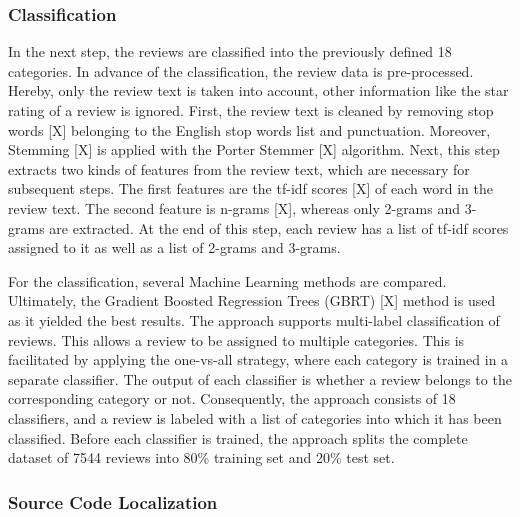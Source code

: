 \subsubsection{Classification}

In the next step, the reviews are classified into the previously defined 18 categories. In advance of the classification, the review data is pre-processed. Hereby, only the review text is taken into account, other information like the star rating of a review is ignored. First, the review text is cleaned by removing stop words [X] belonging to the English stop words list and punctuation. Moreover, Stemming [X] is applied with the Porter Stemmer [X] algorithm. Next, this step extracts two kinds of features from the review text, which are necessary for subsequent steps. The first features are the tf-idf scores [X] of each word in the review text. The second feature is n-grams [X], whereas only 2-grams and 3-grams are extracted. At the end of this step, each review has a list of tf-idf scores assigned to it as well as a list of 2-grams and 3-grams. 

For the classification, several Machine Learning methods are compared. Ultimately, the Gradient Boosted Regression Trees (GBRT) [X] method is used as it yielded the best results. 
The approach supports multi-label classification of reviews. This allows a review to be assigned to multiple categories. This is facilitated by applying the one-vs-all strategy, where each category is trained in a separate classifier. The output of each classifier is whether a review belongs to the corresponding category or not. Consequently, the approach consists of 18 classifiers, and a review is labeled with a list of categories into which it has been classified. Before each classifier is trained, the approach splits the complete dataset of 7544 reviews into 80\% training set and 20\% test set.  

\subsubsection{Source Code Localization}

